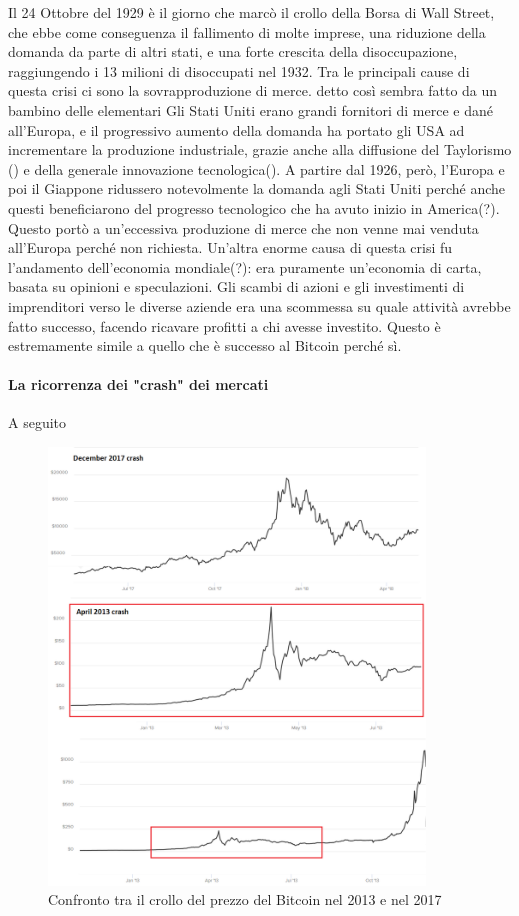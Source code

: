 \documentclass {article}
\begin{document}
{Il 24 Ottobre del 1929 è il giorno che marcò il crollo della Borsa di Wall Street, che ebbe come conseguenza il fallimento di molte imprese, una riduzione della domanda da parte di altri stati, e una forte crescita della disoccupazione, raggiungendo i 13 milioni di disoccupati nel 1932.
Tra le principali cause di questa crisi ci sono la sovrapproduzione di merce. detto così sembra fatto da un bambino delle elementari
Gli Stati Uniti erano grandi fornitori di merce e dané all'Europa, e il progressivo aumento della domanda ha portato gli USA ad incrementare la produzione industriale, grazie anche alla diffusione del Taylorismo () e della generale innovazione tecnologica().
A partire dal 1926, però, l'Europa e poi il Giappone ridussero notevolmente la domanda agli Stati Uniti perché anche questi beneficiarono del progresso tecnologico che ha avuto inizio in America(?).
Questo portò a un'eccessiva produzione di merce che non venne mai venduta all'Europa perché non richiesta.
Un'altra enorme causa di questa crisi fu l'andamento dell'economia mondiale(?): era puramente un'economia di carta, basata su opinioni e speculazioni.
Gli scambi di azioni e gli investimenti di imprenditori verso le diverse aziende era una scommessa su quale attività avrebbe fatto successo, facendo ricavare profitti a chi avesse investito.
Questo è estremamente simile a quello che è successo al Bitcoin perché sì.


\paragraph {La ricorrenza dei "crash" dei mercati}


A seguito 

\vspace {0.5cm}
\begin{figure}
\includegraphics [width = 10cm] {crash2.png}
\centering
\caption {Confronto tra il crollo del prezzo del Bitcoin nel 2013 e nel 2017}
\end{figure}
\vspace {0.2cm}
\noindent
%

}
\end{document}
